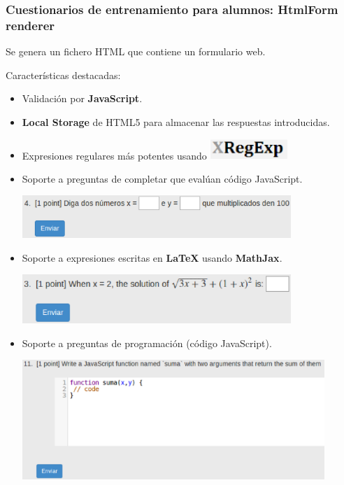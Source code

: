 \documentclass{beamer}
\begin{document}
\begin{frame}[allowframebreaks]
\frametitle{Cuestionarios de entrenamiento para alumnos: HtmlForm renderer}
  Se genera un fichero HTML que contiene un formulario web. 
  \bigskip
  
  Características destacadas:
  \begin{itemize}
    \item Validación por {\bfseries JavaScript}.
    \item {\bfseries Local Storage} de HTML5 para almacenar las respuestas introducidas.
    \item Expresiones regulares más potentes usando \includegraphics[width=0.23\textwidth]{img/xregexp.eps}
    \framebreak
    
    \item Soporte a preguntas de completar que evalúan código JavaScript.
    \bigskip
    \begin{center}
      \includegraphics[width=0.8\textwidth]{img/fi_p.eps}
    \end{center}
    \bigskip
    
    \item Soporte a expresiones escritas en {\bfseries LaTeX} usando {\bfseries MathJax}.
    \bigskip
    \begin{center}
      \includegraphics[width=0.8\textwidth]{img/latex.eps}
    \end{center}
    \framebreak
    
    \item Soporte a preguntas de programación (código JavaScript).
    \bigskip
    \begin{center}
      \includegraphics[width=0.9\textwidth]{img/programming.eps}
    \end{center}
    \framebreak
    

\end{itemize}
\end{frame}
\end{document}
